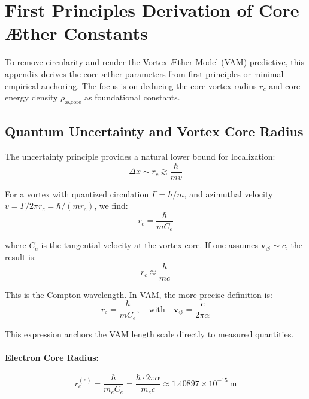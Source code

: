 \documentclass[a4paper,12pt]{article}
\begin{document}
\section{First Principles Derivation of Core \AE{}ther Constants}

        To remove circularity and render the Vortex \AE{}ther Model (VAM) predictive, this appendix derives the core \ae{}ther parameters from first principles or minimal empirical anchoring. The focus is on deducing the core vortex radius $r_c$ and core energy density $\rho_{\text{\ae,core}}$ as foundational constants.

        \subsection{ Quantum Uncertainty and Vortex Core Radius}

        The uncertainty principle provides a natural lower bound for localization:
        \begin{equation}
        \Delta x \sim r_c \gtrsim \frac{\hbar}{m v}
        \end{equation}

        For a vortex with quantized circulation $\Gamma = h/m$, and azimuthal velocity $v = \Gamma / 2\pi r_c = \hbar / (m r_c)$, we find:
        \begin{equation}
        r_c = \frac{\hbar}{m C_e}
        \end{equation}

        where $C_e$ is the tangential velocity at the vortex core. If one assumes $\mathbf{v}_{\scriptscriptstyle\boldsymbol{\circlearrowleft}} \sim c$, the result is:
        \begin{equation}
        r_c \approx \frac{\hbar}{m c}
        \end{equation}

        This is the Compton wavelength. In VAM, the more precise definition is:
        \begin{equation}
        r_c = \frac{\hbar}{m C_e}, \quad \text{with} \quad \mathbf{v}_{\scriptscriptstyle\boldsymbol{\circlearrowleft}} = \frac{c}{2\pi \alpha}
        \end{equation}

        This expression anchors the VAM length scale directly to measured quantities.

        \paragraph{Electron Core Radius:}
        \begin{equation}
        r_c^{(e)} = \frac{\hbar}{m_e C_e} = \frac{\hbar \cdot 2\pi \alpha}{m_e c} \approx 1.40897 \times 10^{-15} \ \text{m}
        \end{equation}
\end{document}
